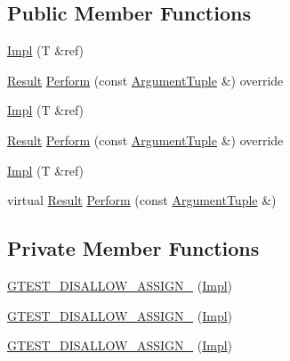 \subsection*{Public Member Functions}
\begin{DoxyCompactItemize}
\item 
\mbox{\hyperlink{classtesting_1_1internal_1_1_return_ref_action_1_1_impl_a245d797a18ba609ce99bc5a383d6c36f}{Impl}} (T \&ref)
\item 
\mbox{\hyperlink{classtesting_1_1_action_interface_a7477de2fe3e4e01c59db698203acaee7}{Result}} \mbox{\hyperlink{classtesting_1_1internal_1_1_return_ref_action_1_1_impl_a12a5137d1e874c95044f0b4a7a355e0f}{Perform}} (const \mbox{\hyperlink{classtesting_1_1_action_interface_af72720d864da4d606629e83edc003511}{Argument\+Tuple}} \&) override
\item 
\mbox{\hyperlink{classtesting_1_1internal_1_1_return_ref_action_1_1_impl_a245d797a18ba609ce99bc5a383d6c36f}{Impl}} (T \&ref)
\item 
\mbox{\hyperlink{classtesting_1_1_action_interface_a7477de2fe3e4e01c59db698203acaee7}{Result}} \mbox{\hyperlink{classtesting_1_1internal_1_1_return_ref_action_1_1_impl_a12a5137d1e874c95044f0b4a7a355e0f}{Perform}} (const \mbox{\hyperlink{classtesting_1_1_action_interface_af72720d864da4d606629e83edc003511}{Argument\+Tuple}} \&) override
\item 
\mbox{\hyperlink{classtesting_1_1internal_1_1_return_ref_action_1_1_impl_a245d797a18ba609ce99bc5a383d6c36f}{Impl}} (T \&ref)
\item 
virtual \mbox{\hyperlink{classtesting_1_1_action_interface_a7477de2fe3e4e01c59db698203acaee7}{Result}} \mbox{\hyperlink{classtesting_1_1internal_1_1_return_ref_action_1_1_impl_ae65024d38782cd53a194346ace6ed9af}{Perform}} (const \mbox{\hyperlink{classtesting_1_1_action_interface_af72720d864da4d606629e83edc003511}{Argument\+Tuple}} \&)
\end{DoxyCompactItemize}
\subsection*{Private Member Functions}
\begin{DoxyCompactItemize}
\item 
\mbox{\hyperlink{classtesting_1_1internal_1_1_return_ref_action_1_1_impl_ad2899b6718fb8b8aaca38419c27c2765}{G\+T\+E\+S\+T\+\_\+\+D\+I\+S\+A\+L\+L\+O\+W\+\_\+\+A\+S\+S\+I\+G\+N\+\_\+}} (\mbox{\hyperlink{classtesting_1_1internal_1_1_return_ref_action_1_1_impl}{Impl}})
\item 
\mbox{\hyperlink{classtesting_1_1internal_1_1_return_ref_action_1_1_impl_ad2899b6718fb8b8aaca38419c27c2765}{G\+T\+E\+S\+T\+\_\+\+D\+I\+S\+A\+L\+L\+O\+W\+\_\+\+A\+S\+S\+I\+G\+N\+\_\+}} (\mbox{\hyperlink{classtesting_1_1internal_1_1_return_ref_action_1_1_impl}{Impl}})
\item 
\mbox{\hyperlink{classtesting_1_1internal_1_1_return_ref_action_1_1_impl_ad2899b6718fb8b8aaca38419c27c2765}{G\+T\+E\+S\+T\+\_\+\+D\+I\+S\+A\+L\+L\+O\+W\+\_\+\+A\+S\+S\+I\+G\+N\+\_\+}} (\mbox{\hyperlink{classtesting_1_1internal_1_1_return_ref_action_1_1_impl}{Impl}})
\end{DoxyCompactItemize}
